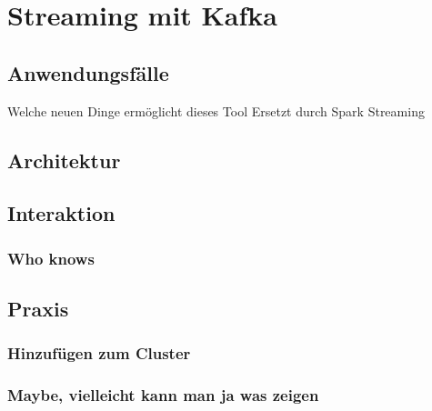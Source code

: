 \chapter{Streaming mit Kafka}
\section{Anwendungsfälle}
Welche neuen Dinge ermöglicht dieses Tool
Ersetzt durch Spark Streaming
\section{Architektur}
\section{Interaktion}
\subsection{Who knows}
\section{Praxis}
\subsection{Hinzufügen zum Cluster}
\subsection{Maybe, vielleicht kann man ja was zeigen}